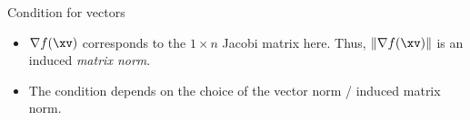 \begin{vbframe}{Condition for vectors}
\begin{itemize}
\item $\nabla f(\xv)$ corresponds to the $1 \times n$ Jacobi matrix here. Thus, $\|\nabla f(\xv)\|$ is an induced \emph{matrix norm}.
\item The condition depends on the choice of the vector norm / induced matrix norm.
\end{itemize}


\end{vbframe}

%
%
%
%
%
%
